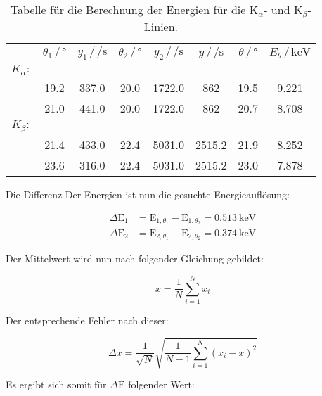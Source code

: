 \begin{table}
  \centering
  \caption{Tabelle für die Berechnung der Energien für die K$_\alpha$- und K$_\beta$-Linien.}
  \label{tab:Energie}
  \begin{tabular}{c c c c c c c c}
    \toprule
    {  } & {$\theta_1  \, / \,  \si{\degree}$} & {$y_1  \, / \,  \si{\per\second}$} & {$\theta_2  \, / \,  \si{\degree}$} & {$y_2  \, / \,  \si{\per\second}$} & {$y  \, / \,  \si{\per\second}$} & {$\theta  \, / \,  \si{\degree}$} & {$E_{\theta}  \, / \,  \si{\kilo\electronvolt}$} \\
    \midrule
    {$ K_{\alpha}: $} \\
     & 19.2 & 337.0 & 20.0 & 1722.0 & 862 & 19.5 & 9.221 \\
     & 21.0 & 441.0 & 20.0 & 1722.0 & 862 & 20.7 & 8.708 \\
    {$ K_{\beta}: $} \\
     & 21.4 & 433.0 & 22.4 & 5031.0 & 2515.2 & 21.9 & 8.252 \\
     & 23.6 & 316.0 & 22.4 & 5031.0 & 2515.2 & 23.0 & 7.878 \\
    \bottomrule
  \end{tabular}
\end{table}

Die Differenz Der Energien ist nun die gesuchte Energieauflösung:

\begin{align*}
  \Delta \text{E}_1 &= \text{E}_{1, \theta_1} - \text{E}_{1, \theta_2} = \SI{0.513}{\kilo\electronvolt} \\
  \Delta \text{E}_2 &= \text{E}_{2, \theta_1} - \text{E}_{2, \theta_2} = \SI{0.374}{\kilo\electronvolt}
\end{align*}

Der Mittelwert wird nun nach folgender Gleichung gebildet:

\begin{equation}
  \label{eqn:mittelwert}
  \overline{x} = \frac{1}{N} \sum_{i=1}^N x_i
\end{equation}

Der entsprechende Fehler nach dieser:

\begin{equation}
  \label{eqn:mittelwertfehler}
  \Delta \overline{x} = \frac{1}{\sqrt{N}} \sqrt{\frac{1}{N-1} \sum_{i=1}^N (x_i - \overline{x})^2}
\end{equation}

Es ergibt sich somit für $\Delta\text{E}$ folgender Wert:

